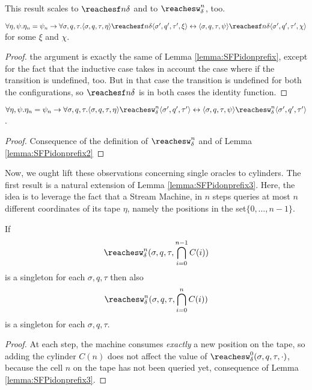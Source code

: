 \begin{conditional}{\notappendix}
    This result scales to $\reachesf n \delta$ and to $\reachesw^n_\delta$, too.

    \begin{lemma}
      \label{lemma:SFPidonprefix2}
      $\forall \eta, \psi. \eta_n=\psi_n \to \forall \sigma, q, \tau.
      \langle \sigma , q, \tau, \eta\rangle \reachesf n \delta
      \langle \sigma' , q', \tau', \xi\rangle \leftrightarrow
      \langle \sigma , q, \tau, \psi\rangle \reachesf n \delta
      \langle \sigma' , q', \tau', \chi\rangle$ for some $\xi$ and $\chi$.
    \end{lemma}
    \begin{proof}
      the argument is exactly the same of Lemma \ref{lemma:SFPidonprefix},
      except for the fact that the inductive case takes in account the case where
      if the transition is undefined, too. But in that case the transition is
      undefined for both the configurations, so $\reachesf n \delta$
      is in both cases the identity function.
    \end{proof}

    \begin{lemma}
      \label{lemma:SFPidonprefix3}
      $\forall \eta, \psi. \eta_n=\psi_n \to \forall \sigma, q, \tau.
      \langle \sigma , q, \tau, \eta\rangle \reachesw^n_\delta
      \langle \sigma' , q', \tau'\rangle \leftrightarrow
      \langle \sigma , q, \tau, \psi\rangle \reachesw^n_\delta
      \langle \sigma' , q', \tau'\rangle$.
    \end{lemma}
    \begin{proof}
      Consequence of the definition of $\reachesw^n_\delta$ and of
      Lemma \ref{lemma:SFPidonprefix2}
    \end{proof}

    Now, we ought lift these observations concerning single oracles to cylinders.
    The first result is a natural extension of Lemma \ref{lemma:SFPidonprefix3}.
    Here, the idea is to leverage the fact that a Stream Machine, in $n$ steps
    queries at most $n$ different coordinates of its tape $\eta$, namely the
    positions in the set$\{0, \ldots, n-1\}$.

    \begin{lemma}
      \label{lemma:auxbsq1}
      If
      \[
              \reachesw^{n}_\delta(\sigma,q, \tau,\bigcap_{i=0}^{n-1} C(i))
      \]
      is a singleton for each $\sigma, q, \tau$ then also
      \[
              \reachesw^{n}_\delta(\sigma,q, \tau,\bigcap_{i=0}^{n} C(i))
      \]
      is a singleton for each $\sigma, q, \tau$.
    \end{lemma}
    \begin{proof}
         At each step, the machine consumes \emph{exactly} a new position on the
         tape, so adding the cylinder $C(n)$ does not affect the value of
         $\reachesw^{0}_\delta(\sigma,q, \tau,\cdot)$, because the cell $n$
         on the tape has not been queried yet, consequence of Lemma \ref{lemma:SFPidonprefix3}.
    \end{proof}


\end{conditional}
